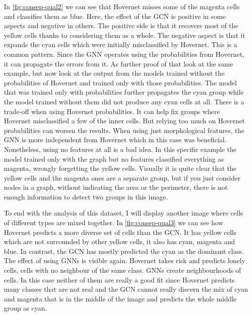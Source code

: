 \newpage

In \autoref{fig:consep-qual2} we can see that Hovernet misses some of the magenta cells and classifies them as blue. Here, the effect of the GCN is positive in some aspects and negative in others. The positive side is that it recovers most of the yellow cells thanks to considering them as a whole. The negative aspect is that it expands the cyan cells which were initially misclassified by Hovernet. This is a common pattern. Since the GNN operates using the probabilities from Hovernet, it can propagate the errors from it. As further proof of that look at the same example, but now look at the output from the models trained without the probabilities of Hovernet and trained only with those probabilities. The model that was trained only with probabilities further propagates the cyan group while the model trained without them did not produce any cyan cells at all. There is a trade-off when using Hovernet probabilities. It can help fix groups where Hovernet misclassified a few of the inner cells. But relying too much on Hovernet probabilities can worsen the results. When using just morphological features, the GNN is more independent from Hovernet which in this case was beneficial. Nonetheless, using no features at all is a bad idea. In this specific example the model trained only with the graph but no features classified everything as magenta, wrongly forgetting the yellow cells. Visually it is quite clear that the yellow cells and the magenta ones are a separate group, but if you just consider nodes in a graph, without indicating the area or the perimeter, there is not enough information to detect two groups in this image.

To end with the analysis of this dataset, I will display another image where cells of different types are mixed together. In \autoref{fig:consep-qual3} we can see how Hovernet predicts a more diverse set of cells than the GCN. It has yellow cells which are not surrounded by other yellow cells, it also has cyan, magenta and blue. In contrast, the GCN has mostly predicted the cyan as the dominant class. The effect of using GNNs is visible again. Hovernet takes risk and predicts lonely cells, cells with no neighbour of the same class. GNNs create neighbourhoods of cells. In this case neither of them are really a good fit since Hovernet predicts many classes that are not real and the GCN cannot really discern the mix of cyan and magenta that is in the middle of the image and predicts the whole middle group as cyan.

